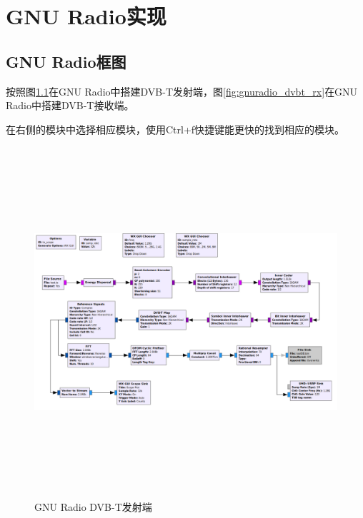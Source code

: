 \chapter{GNU Radio实现}
	\section{GNU Radio框图}
		\par 按照图\ref{fig:gnuradio_dvbt_tx}在GNU Radio中搭建DVB-T发射端，图\ref{fig:gnuradio_dvbt_rx}在GNU Radio中搭建DVB-T接收端。
		\par 在右侧的模块中选择相应模块，使用Ctrl+f快捷键能更快的找到相应的模块。
		\begin{figure}[htbp]
			\centering
			\includegraphics[height=13cm,angle=-90]{figures/gnuradio_dvbt_tx.png}
			\caption{GNU Radio DVB-T发射端}
			\label{fig:gnuradio_dvbt_tx}
		\end{figure}
